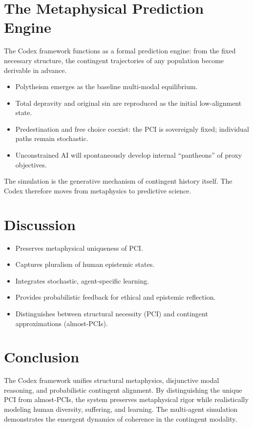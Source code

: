 \documentclass[12pt]{article}
\begin{document}
\section{The Metaphysical Prediction Engine}
The Codex framework functions as a formal prediction engine: from the fixed necessary structure, the contingent trajectories of any population become derivable in advance.

\begin{itemize}
    \item Polytheism emerges as the baseline multi-modal equilibrium.
    \item Total depravity and original sin are reproduced as the initial low-alignment state.
    \item Predestination and free choice coexist: the PCI is sovereignly fixed; individual paths remain stochastic.
    \item Unconstrained AI will spontaneously develop internal “pantheons” of proxy objectives.
\end{itemize}

The simulation is the generative mechanism of contingent history itself. The Codex therefore moves from metaphysics to predictive science.

\section{Discussion}
\begin{itemize}
    \item Preserves metaphysical uniqueness of PCI.
    \item Captures pluralism of human epistemic states.
    \item Integrates stochastic, agent-specific learning.
    \item Provides probabilistic feedback for ethical and epistemic reflection.
    \item Distinguishes between structural necessity (PCI) and contingent approximations (almost-PCIs).
\end{itemize}

\section{Conclusion}
The Codex framework unifies structural metaphysics, disjunctive modal reasoning, and probabilistic contingent alignment. By distinguishing the unique PCI from almost-PCIs, the system preserves metaphysical rigor while realistically modeling human diversity, suffering, and learning. The multi-agent simulation demonstrates the emergent dynamics of coherence in the contingent modality.
\end{document}
